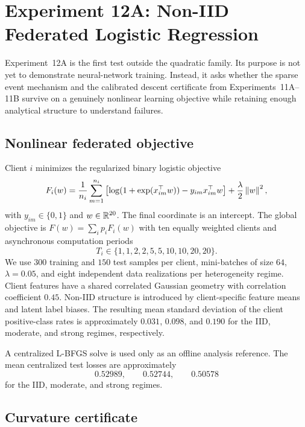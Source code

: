 \section{Experiment 12A: Non-IID Federated Logistic Regression}
\label{sec:experiment-12a-logistic}

Experiment~12A is the first test outside the quadratic family. Its purpose is not yet to demonstrate neural-network training. Instead, it asks whether the sparse event mechanism and the calibrated descent certificate from Experiments~11A--11B survive on a genuinely nonlinear learning objective while retaining enough analytical structure to understand failures.

\subsection{Nonlinear federated objective}

Client $i$ minimizes the regularized binary logistic objective
\begin{equation}
  F_i(w)
  =
  \frac{1}{n_i}\sum_{m=1}^{n_i}
  \left[\log(1+\exp(x_{im}^\top w))-y_{im}x_{im}^\top w\right]
  +\frac{\lambda}{2}\left\lVert w\right\rVert^2,
\end{equation}
with $y_{im}\in\{0,1\}$ and $w\in\mathbb{R}^{20}$. The final coordinate is an intercept. The global objective is $F(w)=\sum_i p_iF_i(w)$ with ten equally weighted clients and asynchronous computation periods
\begin{equation}
  T_i\in\{1,1,2,2,5,5,10,10,20,20\}.
\end{equation}
We use $300$ training and $150$ test samples per client, mini-batches of size $64$, $\lambda=0.05$, and eight independent data realizations per heterogeneity regime. Client features have a shared correlated Gaussian geometry with correlation coefficient $0.45$. Non-IID structure is introduced by client-specific feature means and latent label biases. The resulting mean standard deviation of the client positive-class rates is approximately $0.031$, $0.098$, and $0.190$ for the IID, moderate, and strong regimes, respectively.

A centralized L-BFGS solve is used only as an offline analysis reference. The mean centralized test losses are approximately
\begin{equation}
  0.52989,\qquad 0.52744,\qquad 0.50578
\end{equation}
for the IID, moderate, and strong regimes.

\subsection{Curvature certificate}

